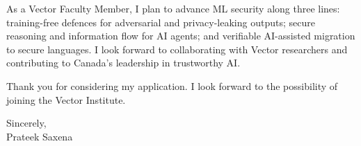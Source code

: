 \documentclass[11pt]{article}
\begin{document}
\noindent
As a Vector Faculty Member, I plan to advance ML security along three lines: training-free defences for adversarial and privacy-leaking outputs; secure reasoning and information flow for AI agents; and verifiable AI-assisted migration to secure languages. I look forward to collaborating with Vector researchers and contributing to Canada's leadership in trustworthy AI.

\vspace{0.3em}
\noindent
Thank you for considering my application. I look forward to the possibility of joining the Vector Institute.

\vspace{0.5em}
\noindent
Sincerely,\\[0.5em]
Prateek Saxena
\end{document}
